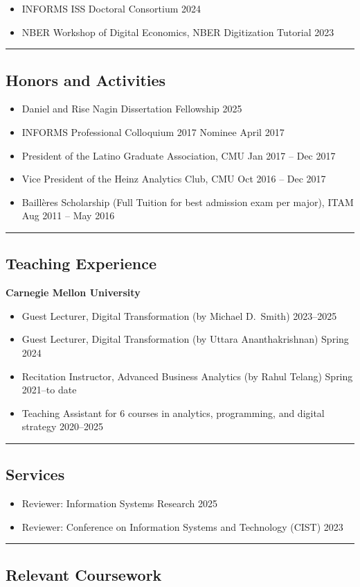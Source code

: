 \documentclass[10pt,letterpaper]{article}
\newcommand{\hsep}{\noindent\textcolor{gray}{\rule{\textwidth}{0.5pt}}}
\newcommand{\block}[1]{\begin{samepage}\hsep\subsection*{#1}\end{samepage}}
\begin{document}
\begin{itemize}[label={}]
\item INFORMS ISS Doctoral Consortium \hfill 2024
\item NBER Workshop of Digital Economics, NBER Digitization Tutorial \hfill 2023
\end{itemize}

\block{Honors and Activities}

\begin{itemize}
\item Daniel and Rise Nagin Dissertation Fellowship \hfill 2025
\item INFORMS Professional Colloquium 2017 Nominee \hfill April 2017
\item President of the Latino Graduate Association, CMU \hfill Jan 2017 -- Dec 2017
\item Vice President of the Heinz Analytics Club, CMU \hfill Oct 2016 -- Dec 2017
\item Baill\`eres Scholarship (Full Tuition for best admission exam per major), ITAM \hfill Aug 2011 -- May 2016
\end{itemize}

\block{Teaching Experience}

\textbf{Carnegie Mellon University}

\begin{itemize}
\item Guest Lecturer, Digital Transformation (by Michael D.\ Smith) \hfill 2023--2025
\item Guest Lecturer, Digital Transformation (by Uttara Ananthakrishnan) \hfill Spring 2024
\item Recitation Instructor, Advanced Business Analytics (by Rahul Telang) \hfill Spring 2021--to date
\item Teaching Assistant for 6 courses in analytics, programming, and digital strategy \hfill 2020--2025
\end{itemize}

\block{Services}

\begin{itemize}
\item Reviewer: Information Systems Research \hfill 2025
\item Reviewer: Conference on Information Systems and Technology (CIST) \hfill 2023
\end{itemize}

\block{Relevant Coursework}
\end{document}
